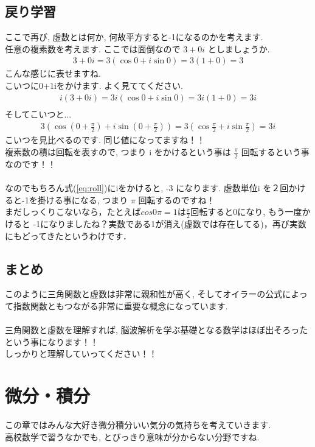 \documentclass[11pt,a4paper]{jreport}
\begin{document}
\section{戻り学習}
ここで再び, 虚数とは何か, 何故平方すると-1になるのかを考えます.\\
任意の複素数を考えます. ここでは面倒なので $ 3 + 0i$ としましょうか.
\begin{eqnarray}
3 + 0i = 3(\cos 0 + i\sin 0) = 3(1 + 0) = 3
\end{eqnarray}
こんな感じに表せますね.\\
こいつに0+1iをかけます. よく見ててください.
\begin{eqnarray}
i(3 + 0i) = 3i(\cos 0 + i\sin 0) = 3i(1+0) = 3i\\
\end{eqnarray}
そしてこいつと...
\begin{eqnarray}
3(\cos (0+\frac{\pi}{2}) + i\sin (0 + \frac{\pi}{2})) = 3(\cos\frac{\pi}{2} + i\sin\frac{\pi}{2}) = 3i
\label{eq:roll}
\end{eqnarray}
こいつを見比べるのです. 同じ値になってますね！！\\
複素数の積は回転を表すので, つまり i をかけるという事は $\frac{\pi}{2}$ 回転するという事なのです！！\\
\\
なのでもちろん式(\ref{eq:roll})にiをかけると, -3 になります. 虚数単位i を２回かけると-1を掛ける事になる, つまり $\pi$ 回転するのですね！\\
まだしっくりこないなら，たとえば$cos0\pi = 1$は$\frac{\pi}{2}$回転すると0になり, もう一度かけると -1になりましたね？実数である1が消え(虚数では存在してる)，再び実数にもどってきたというわけです．
\section{まとめ}
このように三角関数と虚数は非常に親和性が高く, そしてオイラーの公式によって指数関数ともつながる非常に重要な概念になっています. \\
\\
三角関数と虚数を理解すれば, 脳波解析を学ぶ基礎となる数学はほぼ出そろったという事になります！！\\
しっかりと理解していってください！！\\

\chapter{微分・積分}
この章ではみんな大好き微分積分いい気分の気持ちを考えていきます.\\
高校数学で習うなかでも, とびっきり意味が分からない分野ですね.\\
\end{document}

